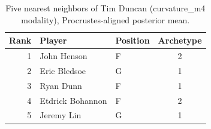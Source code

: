 \begin{table}[htbp]
  \centering\small
  \begin{tabular}{rllc}
    \toprule
    Rank & Player & Position & Archetype \\
    \midrule
    1 & John Henson & F & 2 \\
    2 & Eric Bledsoe & G & 1 \\
    3 & Ryan Dunn & F & 1 \\
    4 & Etdrick Bohannon & F & 2 \\
    5 & Jeremy Lin & G & 1 \\
    \bottomrule
  \end{tabular}
  \caption{Five nearest neighbors of Tim Duncan (curvature_m4 modality), Procrustes-aligned posterior mean.}
  \label{tab:Tim_Duncan_neighbors_curvature_m4}
\end{table}

